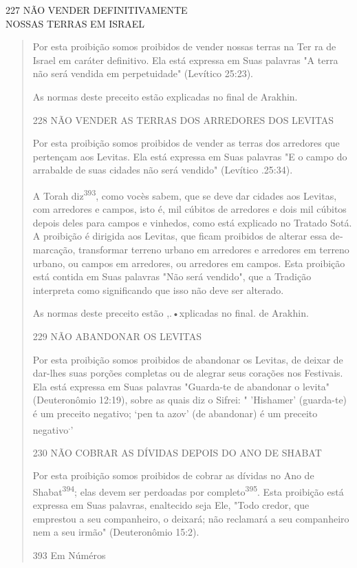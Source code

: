 227 NÃO VENDER DEFINITIVAMENTE\\
NOSSAS TERRAS EM ISRAEL

\begin{quote}
Por esta proibição somos proibidos de vender nossas terras na Ter ra de
Israel em caráter definitivo. Ela está expressa em Suas palavras "A
terra não será vendida em perpetuidade" (Levítico 25:23).

As normas deste preceito estão explicadas no final de Arakhin.

228 NÃO VENDER AS TERRAS DOS ARREDORES DOS LEVITAS

Por esta proibição somos proibidos de vender as terras dos arredo­res
que pertençam aos Levitas. Ela está expressa em Suas palavras "E o campo
do arrabalde de suas cidades não será vendido" (Levítico .25:34).

A Torah diz\textsuperscript{393}, como vocès sabem, que se deve dar
cidades aos Le­vitas, com arredores e campos, isto é, mil cúbitos de
arredores e dois mil cúbi­tos depois deles para campos e vinhedos, como
está explicado no Tratado So­tá. A proibição é dirigida aos Levitas, que
ficam proibidos de alterar essa de­marcação, transformar terreno urbano
em arredores e arredores em terreno ur­bano, ou campos em arredores, ou
arredores em campos. Esta proibição está contida em Suas palavras "Não
será vendido", que a Tradição interpreta como significando que isso não
deve ser alterado.

As normas deste preceito estão ,.•xplicadas no final. de Arakhin.

229 NÃO ABANDONAR OS LEVITAS

Por esta proibição somos proibidos de abandonar os Levitas, de dei­xar
de dar-lhes suas porções completas ou de alegrar seus corações nos
Festi­vais. Ela está expressa em Suas palavras "Guarda-te de abandonar o
levita" (Deu­teronômio 12:19), sobre as quais diz o Sifrei: " 'Hishamer'
(guarda-te) é um pre­ceito negativo; `pen ta azov' (de abandonar) é um
preceito negativo\textsuperscript{.}'

230 NÃO COBRAR AS DÍVIDAS DEPOIS DO ANO DE SHABAT

Por esta proibição somos proibidos de cobrar as dívidas no Ano de
Shabat\textsuperscript{394}; elas devem ser perdoadas por
completo\textsuperscript{395}. Esta proibição está ex­pressa em Suas
palavras, enaltecido seja Ele, "Todo credor, que emprestou a seu
companheiro, o deixará; não reclamará a seu companheiro nem a seu
ir­mão" (Deuteronômio 15:2).

393 Em Núméros
\end{quote}

